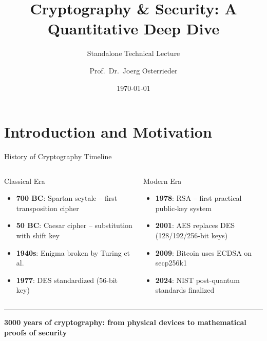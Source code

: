 \documentclass[8pt,aspectratio=169]{beamer}
\title{Cryptography \& Security: A Quantitative Deep Dive}
\subtitle{Standalone Technical Lecture}
\author{Prof.~Dr.~Joerg Osterrieder}
\institute{University Lecture Series}
\date{\today}
\newcommand{\bottomnote}[1]{\vfill\vspace{-2mm}\textcolor{mllavender2}{\rule{\textwidth}{0.4pt}}\vspace{1mm}\footnotesize\textbf{#1}}
\begin{document}
\begin{frame}
\titlepage
\end{frame}

\section{Introduction and Motivation}

\begin{frame}{History of Cryptography Timeline}
\vspace{2mm}
\begin{columns}
\begin{block}{Classical Era}
\begin{itemize}\small
  \item \textbf{700 BC}: Spartan scytale -- first transposition cipher
  \item \textbf{50 BC}: Caesar cipher -- substitution with shift key
  \item \textbf{1940s}: Enigma broken by Turing et al.
  \item \textbf{1977}: DES standardized (56-bit key)
\end{itemize}
\end{block}
\begin{block}{Modern Era}
\begin{itemize}\small
  \item \textbf{1978}: RSA -- first practical public-key system
  \item \textbf{2001}: AES replaces DES (128/192/256-bit keys)
  \item \textbf{2009}: Bitcoin uses ECDSA on secp256k1
  \item \textbf{2024}: NIST post-quantum standards finalized
\end{itemize}
\end{block}
\end{columns}
\bottomnote{3000 years of cryptography: from physical devices to mathematical proofs of security}
\end{frame}
\end{document}
